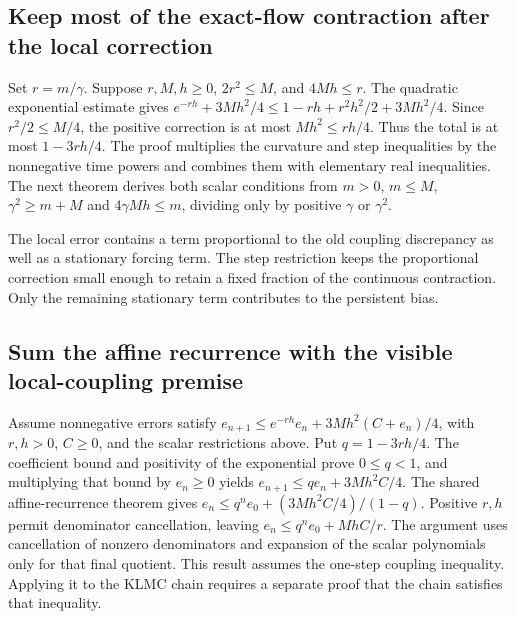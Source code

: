 \documentclass[11pt,a4paper]{report}
\begin{document}
\subsection{\texorpdfstring{Keep most of the exact-flow contraction after the local correction}{Keep most of the exact-flow contraction after the local correction}}
\label{report-step-KineticLangevin-Recurrence-lean-2}


Set \(r=m/\gamma\). Suppose \(r,M,h\ge0\), \(2r^2\le M\), and \(4Mh\le r\). The quadratic exponential estimate gives \(e^{-rh}+3Mh^2/4\le1-rh+r^2h^2/2+3Mh^2/4\). Since \(r^2/2\le M/4\), the positive correction is at most \(Mh^2\le rh/4\). Thus the total is at most \(1-3rh/4\). The proof multiplies the curvature and step inequalities by the nonnegative time powers and combines them with elementary real inequalities. The next theorem derives both scalar conditions from \(m>0\), \(m\le M\), \(\gamma^2\ge m+M\) and \(4\gamma Mh\le m\), dividing only by positive \(\gamma\) or \(\gamma^2\).



The local error contains a term proportional to the old coupling discrepancy as well as a stationary forcing term. The step restriction keeps the proportional correction small enough to retain a fixed fraction of the continuous contraction. Only the remaining stationary term contributes to the persistent bias.

\subsection{\texorpdfstring{Sum the affine recurrence with the visible local-coupling premise}{Sum the affine recurrence with the visible local-coupling premise}}
\label{report-step-KineticLangevin-Recurrence-lean-3}


Assume nonnegative errors satisfy \(e_{n+1}\le e^{-rh}e_n+3Mh^2(C+e_n)/4\), with \(r,h>0\), \(C\ge0\), and the scalar restrictions above. Put \(q=1-3rh/4\). The coefficient bound and positivity of the exponential prove \(0\le q<1\), and multiplying that bound by \(e_n\ge0\) yields \(e_{n+1}\le qe_n+3Mh^2C/4\). The shared affine-recurrence theorem gives \(e_n\le q^ne_0+(3Mh^2C/4)/(1-q)\). Positive \(r,h\) permit denominator cancellation, leaving \(e_n\le q^ne_0+MhC/r\). The argument uses cancellation of nonzero denominators and expansion of the scalar polynomials only for that final quotient. This result assumes the one-step coupling inequality. Applying it to the KLMC chain requires a separate proof that the chain satisfies that inequality.
\end{document}
